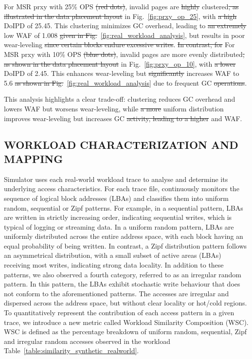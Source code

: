 \documentclass{ieeeaccess}
\begin{document}
For MSR prxy with 25\% OPS \sout{(red dots)}, invalid pages are \sout{highly} clustered\sout{, as illustrated in the data placement layout} in Fig.~\ref{fig:prxy_op_25}, with \sout{a high} DoIPD of 25.45. This clustering minimizes GC overhead, leading to \sout{an extremely} low WAF of 1.008\sout{ given in Fig.}~\ref{fig:real_workload_analysis}, but results in poor wear-leveling\sout{ since certain blocks endure excessive writes}. \sout{In contrast, for} For MSR prxy with 10\% OPS \sout{(blue dots)}, invalid pages are more evenly distributed\sout{, as shown in the data placement layout} in Fig.~\ref{fig:prxy_op_10}, with \sout{a lower} DoIPD of 2.45. This enhances wear-leveling but \sout{significantly} increases WAF to 5.6\sout{ as shown in Fig.}~\ref{fig:real_workload_analysis} due to frequent GC\sout{ operations}.

This analysis highlights a clear trade-off: clustering reduces GC overhead and lowers WAF but worsens wear-leveling, while \sout{a more} uniform distribution improves wear-leveling but increases GC\sout{ activity, leading to a higher} and WAF.


\subsection{WORKLOAD CHARACTERIZATION AND MAPPING}
\label{subsec:mapping}
Simulator \eyanassdsim uses each real-world workload trace to analyse and determine its underlying access characteristics. For each trace file, \eyanassdsim continuously monitors the sequence of logical block addresses (LBAs) and classifies them into uniform random, sequential or Zipf patterns. For example, in a sequential pattern, LBAs are written in strictly increasing order, indicating sequential writes, which is typical of logging or streaming data. In a uniform random pattern, LBAs are uniformly distributed across the entire address space, with each block having an equal probability of being written. In contrast, a Zipf distribution pattern follows an asymmetrical distribution, with a small subset of active areas (LBAs) receiving most writes, indicating strong data locality.
In addition to these patterns, we also observed a fourth category, referred to as an irregular random pattern. In this pattern, the LBAs exhibit stochastic write behaviour that does not conform to the aforementioned patterns. The accesses are irregular and dispersed across the address space, but without clear locality or hot\slash cold regions\cite{hot-cold}.
To quantitatively represent the contribution of each access pattern in a given trace, we introduce a new metric called Workload Similarity Composition (WSC). 
WSC is defined as the percentage breakdown of uniform random, sequential, Zipf and irregular random accesses observed in the workload Table~\ref{table:similarity_synthetic_realworld}.
\end{document}
